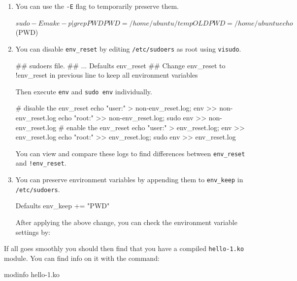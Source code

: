 \documentclass[10pt, oneside]{book}
\begin{document}
\begin{enumerate}
  \item {
  You can use the \verb|-E| flag to temporarily preserve them.

  \begin{codebash}
    $ sudo -E make -p | grep PWD
    PWD = /home/ubuntu/temp
    OLDPWD = /home/ubuntu
    echo $(PWD)
  \end{codebash}
  }

  \item {
  You can disable \verb|env_reset| by editing \verb|/etc/sudoers| as root using \verb|visudo|.

  \begin{code}
  ## sudoers file.
  ##
  ...
  Defaults env_reset
  ## Change env_reset to !env_reset in previous line to keep all environment variables
  \end{code}

  Then execute \verb|env| and \verb|sudo env| individually.

  \begin{codebash}
    # disable the env_reset
    echo "user:" > non-env_reset.log; env >> non-env_reset.log
    echo "root:" >> non-env_reset.log; sudo env >> non-env_reset.log
    # enable the env_reset
    echo "user:" > env_reset.log; env >> env_reset.log
    echo "root:" >> env_reset.log; sudo env >> env_reset.log
  \end{codebash}

  You can view and compare these logs to find differences between \verb|env_reset| and \verb|!env_reset|.
  }

  \item {You can preserve environment variables by appending them to \verb|env_keep| in \verb|/etc/sudoers|.

  \begin{code}
  Defaults env_keep += "PWD"
  \end{code}

  After applying the above change, you can check the environment variable settings by:

  }
\end{enumerate}

If all goes smoothly you should then find that you have a compiled \verb|hello-1.ko| module.
You can find info on it with the command:
\begin{codebash}
modinfo hello-1.ko
\end{codebash}
\end{document}
